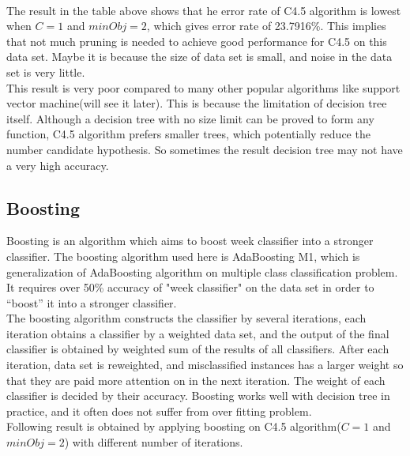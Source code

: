 \documentclass[a4paper,11pt]{article}
\begin{document}
\vspace{0.5cm}\\
The result in the table above shows that he error rate of C4.5 algorithm is lowest when $C=1$ and $minObj=2$, which gives error rate of 23.7916\%. This implies that not much pruning is needed to achieve good performance for C4.5 on this data set. Maybe it is because the size of data set is small, and noise in the data set is very little.\\
This result is very poor compared to many other popular algorithms like support vector machine(will see it later). This is because the limitation of decision tree itself. Although a decision tree with no size limit can be proved to form any function, C4.5 algorithm prefers smaller trees,
which potentially reduce the number candidate hypothesis. So sometimes the result decision tree may not have a very high accuracy.\\

\subsection{Boosting}
Boosting is an algorithm which aims to boost week classifier into a stronger classifier. The boosting algorithm used here is AdaBoosting M1, which is
generalization of AdaBoosting algorithm on multiple class classification problem. It requires over 50\% accuracy of "week classifier" on the data set
in order to ``boost'' it into a stronger classifier.\\
The boosting algorithm constructs the classifier by several iterations, each iteration obtains a classifier by a weighted data set, and the output of the final classifier is obtained by weighted sum of the results of all classifiers. After each iteration, data set is reweighted, and misclassified instances has a larger weight so that they are paid more attention on in the next iteration. The weight of each classifier is decided by their accuracy. Boosting works well with decision tree in practice, and it often does not suffer from over fitting problem.\\
Following result is obtained by applying boosting on C4.5 algorithm($C=1$ and $minObj=2$) with different number of iterations.
\end{document}

